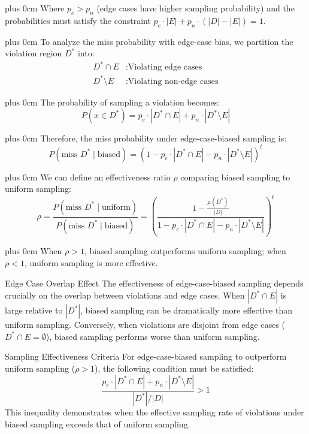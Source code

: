 \documentclass[11pt,a4paper]{article}
\newcommand{\justifytext}{\leftskip=0pt \rightskip=0pt plus 0cm}
\begin{document}
\justifytext
Where $p_e > p_n$ (edge cases have higher sampling probability) and the probabilities must satisfy the constraint $p_e \cdot |E| + p_n \cdot (|D| - |E|) = 1$.

\justifytext
To analyze the miss probability with edge-case bias, we partition the violation region $D^*$ into:
\begin{align}
D^* \cap E &: \text{Violating edge cases} \\
D^* \setminus E &: \text{Violating non-edge cases}
\end{align}

\justifytext
The probability of sampling a violation becomes:
\begin{equation}
P(x \in D^*) = p_e \cdot |D^* \cap E| + p_n \cdot |D^* \setminus E|
\end{equation}

\justifytext
Therefore, the miss probability under edge-case-biased sampling is:
\begin{equation}
P(\text{miss } D^* \mid \text{biased}) = (1 - p_e \cdot |D^* \cap E| - p_n \cdot |D^* \setminus E|)^t
\end{equation}

\justifytext
We can define an effectiveness ratio $\rho$ comparing biased sampling to uniform sampling:
\begin{equation}
\rho = \frac{P(\text{miss } D^* \mid \text{uniform})}{P(\text{miss } D^* \mid \text{biased})} = \left(\frac{1 - \frac{\mu(D^*)}{|D|}}{1 - p_e \cdot |D^* \cap E| - p_n \cdot |D^* \setminus E|}\right)^t
\end{equation}

\justifytext
When $\rho > 1$, biased sampling outperforms uniform sampling; when $\rho < 1$, uniform sampling is more effective.

\begin{theorembox}{Edge Case Overlap Effect}
The effectiveness of edge-case-biased sampling depends crucially on the overlap between violations and edge cases. When $|D^* \cap E|$ is large relative to $|D^*|$, biased sampling can be dramatically more effective than uniform sampling. Conversely, when violations are disjoint from edge cases ($D^* \cap E = \emptyset$), biased sampling performs worse than uniform sampling.
\end{theorembox}

\begin{theorembox}{Sampling Effectiveness Criteria}
For edge-case-biased sampling to outperform uniform sampling ($\rho > 1$), the following condition must be satisfied:
\begin{equation}
\frac{p_e \cdot |D^* \cap E| + p_n \cdot |D^* \setminus E|}{|D^*|/|D|} > 1
\end{equation}
This inequality demonstrates when the effective sampling rate of violations under biased sampling exceeds that of uniform sampling.
\end{theorembox}
\end{document}
